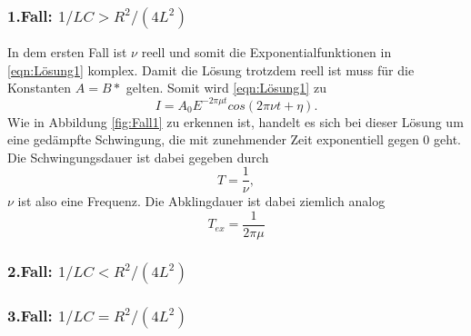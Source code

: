 \subsubsection*{1.Fall: $1/LC>R^2/(4L^2)$}
In dem ersten Fall ist $\nu$ reell und somit die Exponentialfunktionen in \eqref{eqn:Lösung1} komplex. Damit die Lösung trotzdem reell ist muss
für die Konstanten $A=B*$ gelten. Somit wird \eqref{eqn:Lösung1} zu
\begin{equation}
    I=A_0E^{-2\pi\mu t} cos(2\pi\nu t+\eta).
    \label{eqn:Fall1}
\end{equation}
Wie in Abbildung \ref{fig:Fall1} zu erkennen ist, handelt es sich bei dieser Lösung um eine gedämpfte Schwingung, die mit zunehmender Zeit 
exponentiell gegen 0 geht. Die Schwingungsdauer ist dabei gegeben durch
\begin{equation*}
    T=\frac{1}{\nu} ,
\end{equation*}
$\nu$ ist also eine Frequenz. Die Abklingdauer ist dabei ziemlich analog
\begin{equation*}
    T_{ex}=\frac{1}{2\pi\mu}
\end{equation*}
\subsubsection*{2.Fall: $1/LC<R^2/(4L^2)$}
\subsubsection*{3.Fall: $1/LC=R^2/(4L^2)$}